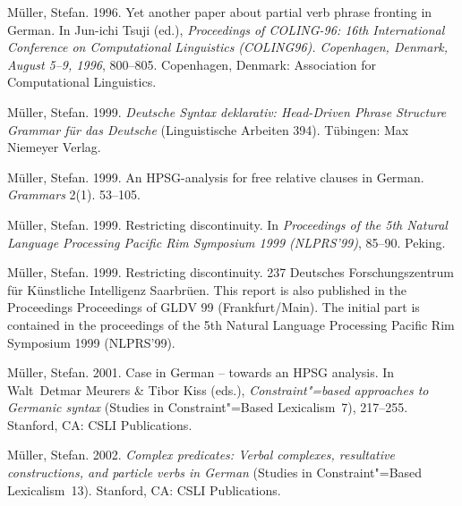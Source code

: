 \begin{thebibliography}{1420}
M{\"u}ller, Stefan. 1996{}.
\newblock Yet another paper about partial verb phrase fronting in {German}.
\newblock In {Jun-ichi} Tsuji (ed.), \emph{Proceedings of {COLING-96: 16th
  International Conference on Computational Linguistics (COLING96). Copenhagen,
  Denmark, August} 5--9, 1996}, 800--805. Copenhagen, Denmark: Association for
  Computational Linguistics.

M{\"u}ller, Stefan. 1999{}.
\newblock \emph{{Deutsche Syntax deklarativ: {Head-Driven Phrase Structure
  Grammar} f{\"u}r das Deutsche}} (Linguistische Arbeiten 394).
\newblock T{\"u}bingen: Max Niemeyer Verlag.

M{\"u}ller, Stefan. 1999{}.
\newblock An {HPSG}-analysis for free relative clauses in {German}.
\newblock \emph{Grammars} 2(1). 53--105.

M{\"u}ller, Stefan. 1999{}.
\newblock Restricting discontinuity.
\newblock In \emph{Proceedings of the {5th Natural Language Processing Pacific
  Rim Symposium 1999 (NLPRS'99)}}, 85--90. Peking.

M{\"u}ller, Stefan. 1999{}.
\newblock Restricting discontinuity.
 237 Deutsches For\-schungs\-zen\-trum f{\"u}r
  K{\"u}nst\-liche Intelligenz Saar\-br{\"u}en.
\newblock This report is also published in the Proceedings Proceedings of GLDV
  99 (Frankfurt/Main). The initial part is contained in the proceedings of the
  5th Natural Language Processing Pacific Rim Symposium 1999 (NLPRS'99).

M{\"u}ller, Stefan. 2001.
\newblock Case in {German} -- towards an {HPSG} analysis.
\newblock In Walt~Detmar Meurers \& Tibor Kiss (eds.), \emph{Constraint"=based
  approaches to {Germanic} syntax} (Studies in Constraint"=Based Lexicalism~7),
  217--255. Stanford, CA: CSLI Publications.

M{\"u}ller, Stefan. 2002{}.
\newblock \emph{Complex predicates: {Verbal} complexes, resultative
  constructions, and particle verbs in {German}} (Studies in Constraint"=Based
  Lexicalism~13).
\newblock Stanford, CA: CSLI Publications.


\end{thebibliography}
